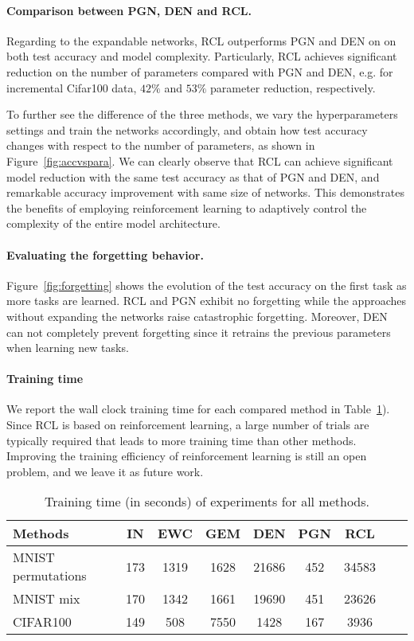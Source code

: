 \documentclass{article}
\begin{document}
\paragraph{Comparison between PGN, DEN and RCL.} Regarding to the expandable networks, RCL outperforms PGN and DEN on on both test accuracy and model complexity. Particularly, RCL achieves significant reduction on the number of parameters compared with PGN and DEN, e.g. for incremental Cifar100 data, $42\%$ and $53\%$ parameter reduction, respectively.

To further see the difference of the three methods, we vary the hyperparameters settings and train the networks accordingly, and obtain how test accuracy changes with respect to the number of parameters, as shown in Figure~\ref{fig:accvspara}. We can clearly observe that RCL can achieve significant model reduction with the same test accuracy as that of PGN and DEN, and remarkable accuracy improvement with same size of networks.
This demonstrates the benefits of employing reinforcement learning to adaptively control the complexity of the entire model architecture.


\paragraph{Evaluating the forgetting behavior.}
Figure~\ref{fig:forgetting} shows the evolution of the test accuracy on the first task as more tasks are learned. RCL and PGN exhibit no forgetting while the approaches without expanding the networks raise catastrophic forgetting. Moreover, DEN can not completely prevent forgetting since it retrains the previous parameters when learning new tasks.



\paragraph{Training time}
We report the wall clock training time for each compared method in Table~\ref{table1}). Since RCL is based on reinforcement learning, a large number of trials are typically required that leads to more training time than other methods. Improving the training efficiency of reinforcement learning is still an open problem, and we leave it as future work.



\begin{table}[ht]
  \caption{Training time (in seconds) of experiments for all methods.}
  \centering
  \begin{tabular}{lcccccccc}
    \toprule
    Methods &IN&EWC&GEM&DEN&PGN&RCL \\
    \hline
    MNIST permutations&173&1319&1628&21686&452&34583\\
    \hline
    MNIST mix&170&1342&1661&19690&451&23626\\
    \hline
    CIFAR100&149&508&7550&1428&167&3936\\
    \bottomrule
  \end{tabular}
  \label{table1}
\end{table}
\end{document}
